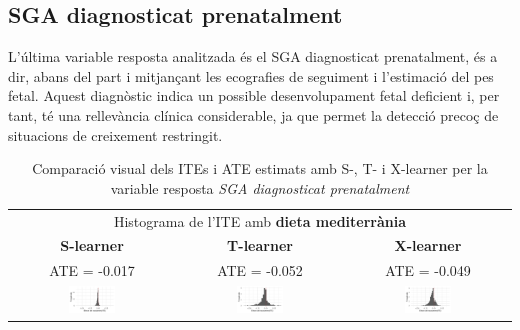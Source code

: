 \documentclass[../main.tex]{subfiles}
\begin{document}
    \subsection{SGA diagnosticat prenatalment}\label{subsec:prenatSGA}

    L’última variable resposta analitzada és el SGA diagnosticat prenatalment, és a dir, abans del part i mitjançant les ecografies de seguiment i l’estimació del pes fetal. Aquest diagnòstic indica un possible desenvolupament fetal deficient i, per tant, té una rellevància clínica considerable, ja que permet la detecció precoç de situacions de creixement restringit.
    
    \begin{table}[H]
        \centering
        \begin{tabular}{ccc}
        \multicolumn{3}{c}{Histograma de l'ITE amb \textbf{dieta mediterrània}} \\
        \small \textbf{S-learner} & \small \textbf{T-learner} & \small \textbf{X-learner} \\
        \footnotesize ATE = -0.017 & \footnotesize ATE = -0.052 & \footnotesize ATE = -0.049 \\
        \includegraphics[width=0.3\textwidth]{imgs/histogrames/hist(SGA_prenatal)S_tract2.jpg} &
        \includegraphics[width=0.3\textwidth]{imgs/histogrames/hist(SGA_prenatal)T_tract2.jpg} &
        \includegraphics[width=0.3\textwidth]{imgs/histogrames/hist(SGA_prenatal)X_tract2.jpg} \\
        \end{tabular}
        \caption{\footnotesize Comparació visual dels ITEs i ATE estimats amb S-, T- i X-learner per la variable resposta \textit{SGA diagnosticat prenatalment}}
        \label{tab:histITE_prenatSGA2}
    \end{table}
\end{document}
